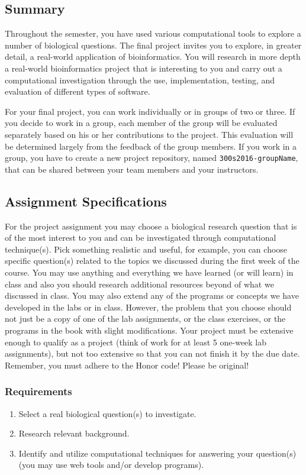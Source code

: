 

\subsection*{Summary}
Throughout the semester, you have used various computational tools to explore a number of biological questions. The
final project invites you to explore, in greater detail, a real-world application of bioinformatics.
You will research in more depth a real-world bioinformatics project that is interesting to you and carry out a computational investigation through the use, implementation, testing, and evaluation of different types of software.

\noindent For your final project, you can work individually or in groups of two or three. If you decide to work in a group, each member of the group will be evaluated separately based on his or her contributions
to the project. This evaluation will be determined largely from the feedback of the group members.
If you work in a group, you have to create a new project repository, named {\tt 300s2016-groupName}, that can be shared between your team members and your instructors.

\subsection*{Assignment Specifications}
For the project assignment you may choose a biological research question that is of the most interest to you and can be investigated through computational technique(s). Pick something realistic and 
 useful, for example, you can choose specific question(s) related to the topics we discussed during the first week of the course. You may use anything and everything we have learned (or will learn) in class and also you should research additional resources beyond of what we discussed in class. You may also extend any of the programs or concepts we have developed in the labs or in class. 
However, the problem that you choose should not just be a copy of one
of the lab assignments, or the class exercises, or the programs in the book
with slight modifications.
Your project must be extensive enough to qualify as a project (think of work for at least 5 one-week lab assignments), but not too extensive so that you can not finish it by the due date.
Remember, you must adhere to the Honor code! Please be original!

\subsubsection*{Requirements}
\begin{enumerate}
	\item Select a real biological question(s) to investigate.
	\item Research relevant background.
	\item Identify and utilize computational techniques for answering your question(s) (you may use web tools and/or develop programs).
\end{enumerate}

